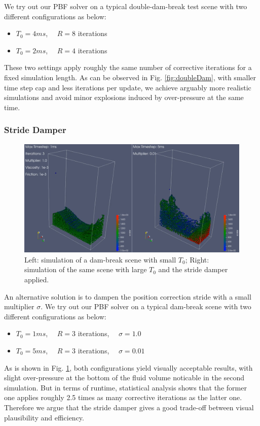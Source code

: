 \documentclass[
	11pt, 
	DIV10,
	ngerman,
	a4paper, 
	oneside, 
	headings=normal, 
	captions=tableheading,
	final, 
	numbers=noenddot
]{scrartcl}
\begin{document}
We try out our PBF solver on a typical double-dam-break test scene with two different configurations as below:

\begin{itemize}
    \item $ T_{0} = 4ms $, $ \quad R = 8 $ iterations
    \item $ T_{0} = 2ms $, $ \quad R = 4 $ iterations
\end{itemize}

These two settings apply roughly the same number of corrective iterations for a fixed simulation length. As can be observed in Fig. \ref{fig:doubleDam}, with smaller time step cap and less iterations per update, we achieve arguably more realistic simulations and avoid minor explosions induced by over-pressure at the same time.

\subsubsection{Stride Damper}

\begin{figure}
    \centering
    \includegraphics[width=.6\textwidth]{pics/pbf_stride_damper.png}
    \caption{Left: simulation of a dam-break scene with small $ T_{0} $; Right: simulation of the same scene with large $ T_{0} $ and the stride damper applied.}
    \label{fig:strideDamper}
\end{figure}

An alternative solution is to dampen the position correction stride with a small multiplier $ \sigma $. We try out our PBF solver on a typical dam-break scene with two different configurations as below:

\begin{itemize}
    \item $ T_{0} = 1ms $, $ \quad R = 3 $ iterations, $ \quad \sigma = 1.0 $
    \item $ T_{0} = 5ms $, $ \quad R = 3 $ iterations, $ \quad \sigma = 0.01 $
\end{itemize}

As is shown in Fig. \ref{fig:strideDamper}, both configurations yield visually acceptable results, with slight over-pressure at the bottom of the fluid volume noticable in the second simulation. But in terms of runtime, statistical analysis shows that the former one applies roughly 2.5 times as many corrective iterations as the latter one. Therefore we argue that the stride damper gives a good trade-off between visual plausibility and efficiency.
\end{document}
